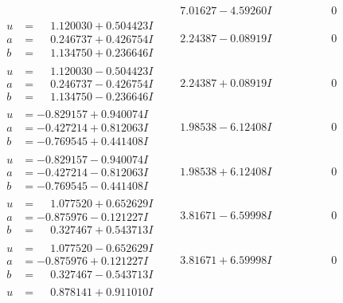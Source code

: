 \documentclass[1p]{elsarticle_modified}
\theoremstyle{definition}
\begin{document}
$$\begin{array}{c|c|c}
 & \phantom{-}7.01627 - 4.59260 I & \phantom{-0.000000 } 0 \\ \hline\begin{aligned}
u &= \phantom{-}1.120030 + 0.504423 I \\
a &= \phantom{-}0.246737 + 0.426754 I \\
b &= \phantom{-}1.134750 + 0.236646 I\end{aligned}
 & \phantom{-}2.24387 - 0.08919 I & \phantom{-0.000000 } 0 \\ \hline\begin{aligned}
u &= \phantom{-}1.120030 - 0.504423 I \\
a &= \phantom{-}0.246737 - 0.426754 I \\
b &= \phantom{-}1.134750 - 0.236646 I\end{aligned}
 & \phantom{-}2.24387 + 0.08919 I & \phantom{-0.000000 } 0 \\ \hline\begin{aligned}
u &= -0.829157 + 0.940074 I \\
a &= -0.427214 + 0.812063 I \\
b &= -0.769545 + 0.441408 I\end{aligned}
 & \phantom{-}1.98538 - 6.12408 I & \phantom{-0.000000 } 0 \\ \hline\begin{aligned}
u &= -0.829157 - 0.940074 I \\
a &= -0.427214 - 0.812063 I \\
b &= -0.769545 - 0.441408 I\end{aligned}
 & \phantom{-}1.98538 + 6.12408 I & \phantom{-0.000000 } 0 \\ \hline\begin{aligned}
u &= \phantom{-}1.077520 + 0.652629 I \\
a &= -0.875976 - 0.121227 I \\
b &= \phantom{-}0.327467 + 0.543713 I\end{aligned}
 & \phantom{-}3.81671 - 6.59998 I & \phantom{-0.000000 } 0 \\ \hline\begin{aligned}
u &= \phantom{-}1.077520 - 0.652629 I \\
a &= -0.875976 + 0.121227 I \\
b &= \phantom{-}0.327467 - 0.543713 I\end{aligned}
 & \phantom{-}3.81671 + 6.59998 I & \phantom{-0.000000 } 0 \\ \hline\begin{aligned}
u &= \phantom{-}0.878141 + 0.911010 I \\

\end{aligned}
\end{array}$$
\end{document}
